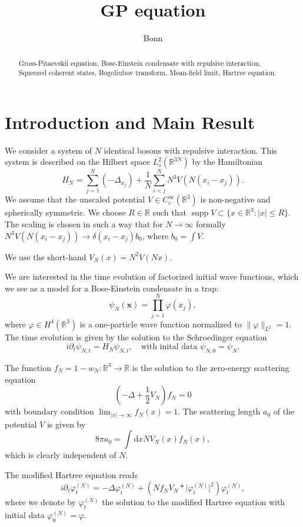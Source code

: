 \documentclass[11pt,a4paper,draft,DIV11]{scrartcl}	%
\author{Bonn}
\title{GP equation}
\newcommand{\di}{\textrm{d}}		%
\newcommand{\Rbb}{\mathbb{R}}		%
\newcommand{\norm}[1]{\lVert#1\rVert}	%
\newcommand{\ph}{\varphi_t^{(N)}}	%
\newcommand{\xn}{\mathbf{x}}		%
\newcommand{\be}[1]{\begin{equation}\label{eq:#1}}	%
\newcommand{\ee}{\end{equation}}
\newcommand{\bd}{\begin{displaymath}}			%
\newcommand{\ed}{\end{displaymath}}
\begin{document}
\maketitle

\begin{abstract}
 Gross-Pitaevskii equation, Bose-Einstein condensate with repulsive interaction, Squeezed coherent states, Bogoliubov transform, Mean-field limit, Hartree equation.
\end{abstract}

\section{Introduction and Main Result}
We consider a system of $N$ identical bosons with repulsive interaction. This system is described on the Hilbert space $L^2_s(\Rbb^{3N})$ by the Hamiltonian
\bd
H_N = \sum_{j=1}^N (-\Delta_{x_j}) + \frac{1}{N}\sum_{i<j}^N N^3 V(N(x_i-x_j)).
\ed
We assume that the unscaled potential $V \in C^\infty_c(\Rbb^3)$ is non-negative and spherically symmetric. We choose $R \in \Rbb$ such that $\operatorname{supp} V \subset \{x \in \Rbb^3 : \lvert x\rvert \leq R \}$. The scaling is chosen in such a way that for $N \to \infty$ formally $N^3 V(N(x_i-x_j)) \to \delta(x_i-x_j) b_0$, where $b_0 = \int V$.

We use the short-hand $V_N(x) = N^2 V(Nx)$.

We are interested in the time evolution of factorized initial wave functions, which we see as a model for a Bose-Einstein condensate in a trap:
\bd
\psi_N(\xn) = \prod_{j=1}^N \varphi(x_j),
\ed
where $\varphi \in H^4(\Rbb^3)$ is a one-particle wave function normalized to $\norm{\varphi}_{L^2} = 1$. The time evolution is given by the solution to the Schroedinger equation 
\bd
i \partial_t \psi_{N,t} = H_N \psi_{N,t},\quad \mbox{with inital data } \psi_{N,0} = \psi_N.
\ed

The function $f_N = 1 - w_N: \Rbb^3 \to \Rbb$ is the solution to the zero-energy scattering equation
\bd
\left(-\Delta + \frac{1}{2}V_N \right) f_N = 0
\ed
with boundary condition $\lim_{\lvert x\rvert \to \infty} f_N(x) = 1$. The scattering length $a_0$ of the potential $V$ is given by
\bd
8\pi a_0 = \int \di x NV_N(x)f_N(x),
\ed
which is clearly independent of $N$.

The modified Hartree equation reads
\be{modHartreeEqu}
i \partial_t \ph = -\Delta \ph + \left(N f_N V_N \ast \lvert \ph\rvert^2 \right) \ph,
\ee
where we denote by $\ph$ the solution to the modified Hartree equation with initial data $\varphi^{(N)}_0 = \varphi$.
\end{document}
